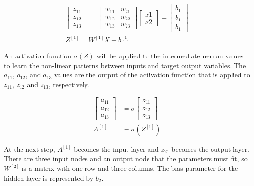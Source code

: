 \begin{equation}
\begin{aligned}
{\left[\begin{array}{l}
z_{11} \\
z_{12} \\
z_{13}
\end{array}\right]=\left[\begin{array}{ll}
w_{11} & w_{21} \\
w_{12} & w_{22} \\
w_{13} & w_{23}
\end{array}\right]\left[\begin{array}{l}
x 1 \\
x 2
\end{array}\right]+\left[\begin{array}{l}
b_{1} \\
b_{1} \\
b_{1}
\end{array}\right]} \\
Z^{[1]}=W^{[1]} X+b^{[1]}
\end{aligned}
\end{equation}

\noindent An activation function $\sigma(Z)$ will be applied to the intermediate neuron values to learn the non-linear patterns between inputs and target output variables.
The $a_{11}$, $a_{12}$, and $a_{13}$ values are the output of the activation function that is applied to $z_{11}$, $z_{12}$ and $z_{13}$, respectively.

\begin{equation}
\begin{aligned}
\left[\begin{array}{l}
a_{11} \\
a_{12} \\
a_{13}
\end{array}\right] &=\sigma\left[\begin{array}{l}
z_{11} \\
z_{12} \\
z_{13}
\end{array}\right] \\
A^{[1]} &=\sigma\left(Z^{[1]}\right)
\end{aligned}
\end{equation}

\noindent At the next step, $A^{[1]}$ becomes the input layer and $z_{21}$ becomes the output layer.
There are three input nodes and an output node that the parameters must fit, so $W^{[2]}$ is a matrix with one row and three columns.
The bias parameter for the hidden layer is represented by $b_2$.

